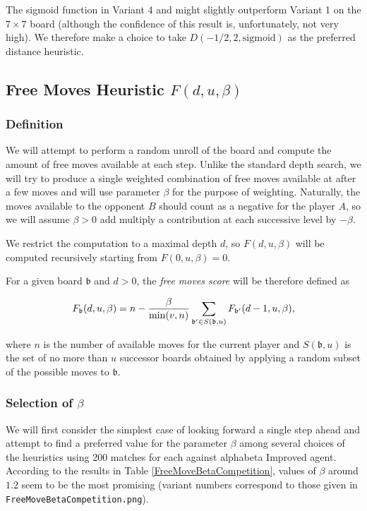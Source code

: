 \documentclass[oneside]{article}   	%
\begin{document}
The sigmoid function in Variant 4 and might slightly outperform Variant 1 on the $7\times 7$ board (although the confidence of this result is, unfortunately, not very high). We therefore make a choice to take $D(-1/2, 2, \textrm{sigmoid})$ as the preferred distance heuristic.


\subsection{Free Moves Heuristic $F(d, u, \beta)$}

\subsubsection{Definition}

We will attempt to perform a random unroll of the board and compute the amount of free moves available at each step. Unlike the standard depth search, we will try to produce a single weighted combination of free moves available at after a few moves and will use parameter $\beta$ for the purpose of weighting. Naturally, the moves available to the opponent $B$ should count as a negative for the player $A$, so we will assume $\beta > 0$ add multiply a contribution at each successive level by $-\beta$.

We restrict the computation to a maximal depth $d$, so $F(d, u, \beta)$ will be computed recursively starting from $F(0, u, \beta) = 0$.

For a given board $\mathfrak b$ and $d>0$, the \textit{free moves score} will be therefore defined as

$$ F_{\mathfrak b}(d, u, \beta) = n - {\beta \over \mathrm{min}(v, n)}  \sum_{{\mathfrak b}' \in S({\mathfrak b}, u)} F_{{\mathfrak b}'}(d-1, u, \beta),$$

where $n$ is the number of available moves for the current player and $S({\mathfrak b}, u)$ is the set of no more than $u$ successor boards obtained by applying a random subset of the possible moves to $\mathfrak b$. 

\subsubsection{Selection of $\beta$}
\label{FreeMoveBetaCompetitions}

We will first consider the simplest case of looking forward a single step ahead and attempt to find a preferred value for the parameter $\beta$ among several choices of the heuristics using 200 matches for each against alphabeta Improved agent. According to the results in Table \ref{FreeMoveBetaCompetition}, values of $\beta$ around $1.2$ seem to be the most promising (variant numbers correspond to those given in \texttt{FreeMoveBetaCompetition.png}).
\end{document}
